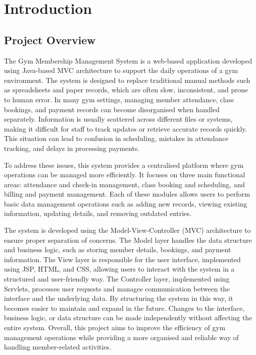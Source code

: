 \documentclass[12pt, a4paper]{article}
\begin{document}
\tableofcontents
\newpage

\listoftables
\listoffigures
\newpage

\section{Introduction}

\subsection{Project Overview}
The Gym Membership Management System is a web-based application developed using Java-based MVC architecture to support the daily operations of a gym environment. 
The system is designed to replace traditional manual methods such as spreadsheets and paper records, which are often slow, inconsistent, and prone to human error.
In many gym settings, managing member attendance, class bookings, and payment records can become disorganised when handled separately.
Information is usually scattered across different files or systems, making it difficult for staff to track updates or retrieve accurate records quickly.
This situation can lead to confusion in scheduling, mistakes in attendance tracking, and delays in processing payments. 

To address these issues, this system provides a centralised platform where gym operations can be managed more efficiently.
It focuses on three main functional areas: attendance and check-in management, class booking and scheduling, and billing and payment management.
Each of these modules allows users to perform basic data management operations such as adding new records, viewing existing information, updating details, and removing outdated entries.

The system is developed using the Model-View-Controller (MVC) architecture to ensure proper separation of concerns.
The Model layer handles the data structure and business logic, such as storing member details, bookings, and payment information.
The View layer is responsible for the user interface, implemented using JSP, HTML, and CSS, allowing users to interact with the system in a structured and user-friendly way.
The Controller layer, implemented using Servlets, processes user requests and manages communication between the interface and the underlying data.
By structuring the system in this way, it becomes easier to maintain and expand in the future. 
Changes to the interface, business logic, or data structure can be made independently without affecting the entire system.
Overall, this project aims to improve the efficiency of gym management operations while providing a more organised and reliable way of handling member-related activities.
\end{document}
